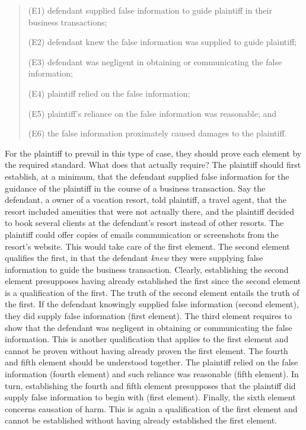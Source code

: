 \documentclass[
  10pt,
  dvipsnames,enabledeprecatedfontcommands]{scrartcl}
\begin{document}
\begin{quote}
(E1) defendant supplied false information to guide plaintiff in their business transactions; 

(E2) defendant knew the false information was supplied to guide plaintiff;

(E3) defendant was negligent in obtaining or communicating the false information;

(E4) plaintiff relied on the false information;

(E5) plaintiff's reliance on the false information was reasonable; and

(E6) the false information proximately caused damages to the plaintiff.
\end{quote}

For the plaintiff to prevail in this type of case, they should prove
each element by the required standard. What does that actually require?
The plaintiff should first establish, at a minimum, that the defendant
supplied false information for the guidance of the plaintiff in the
course of a business transaction. Say the defendant, a owner of a
vacation resort, told plaintiff, a travel agent, that the resort
included amenities that were not actually there, and the plaintiff
decided to book several clients at the defendant's resort instead of
other resorts. The plaintiff could offer copies of emails communication
or screenshots from the resort's website. This would take care of the
first element. The second element qualifies the first, in that the
defendant \emph{knew} they were supplying false information to guide the
business transaction. Clearly, establishing the second element
presupposes having already established the first since the second
element is a qualification of the first. The truth of the second element
entails the truth of the first. If the defendant knowingly supplied
false information (second element), they did supply false information
(first element). The third element requires to show that the defendant
was negligent in obtaining or communicating the false information. This
is another qualification that applies to the first element and cannot be
proven without having already proven the first element. The fourth and
fifth element should be understood together. The plaintiff relied on the
false information (fourth element) and such reliance was reasonable
(fifth element). In turn, establishing the fourth and fifth element
presupposes that the plaintiff did supply false information to begin
with (first element). Finally, the sixth element concerns causation of
harm. This is again a qualification of the first element and cannot be
established without having already established the first element.
\end{document}
